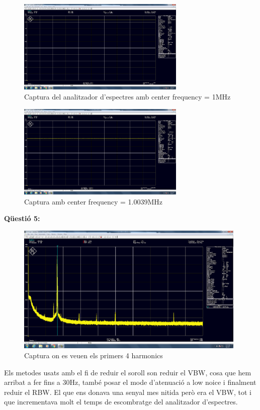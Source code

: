 \documentclass[12pt, a4papre]{article}
\begin{document}
	\begin{figure}[H]
		\begin{center}
		\includegraphics[width=80mm]{4_1.png}
		\caption{Captura del analitzador d'espectres amb center frequency = 1MHz}
		\end{center}
	\end{figure}
	
	\begin{figure}[H]
		\begin{center}
		\includegraphics[width=80mm]{4_2.png}
		\caption{Captura amb center frequency = 1.0039MHz}
		\end{center}
	\end{figure}
	
	\textbf{Qüestió 5:} 
	
	\begin{figure}[H]
		\begin{center}
		\includegraphics[width=110mm]{5.png}
		\caption{Captura on es veuen els primers 4 harmonics}
		\end{center}
	\end{figure}
	
	Els metodes usats amb el fi de reduir el soroll son reduir el VBW, cosa que hem arribat a fer fins a 30Hz, també posar el mode d'atenuació a low noice i finalment reduir el RBW. El que ens donava una senyal mes nitida però era el VBW, tot i que incrementava molt el temps de escombratge del analitzador d'espectres.
	
\end{document}
